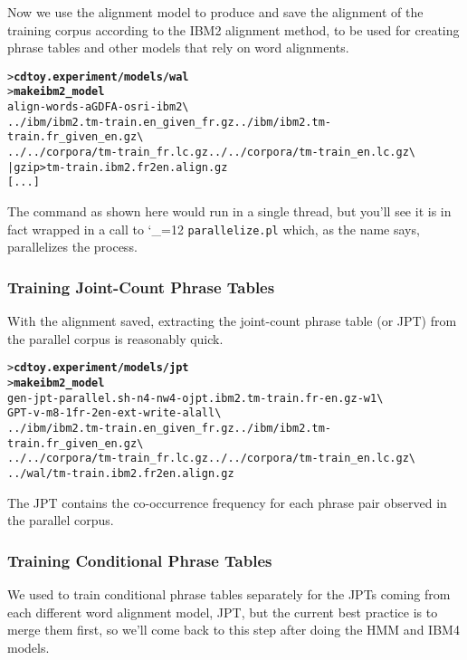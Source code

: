 \documentclass[11pt,letterpaper]{article}
\newcommand{\bs}{\textbackslash{}}
\def\code{\begingroup\catcode`\_=12 \codex}
\newcommand{\codex}[1]{\texttt{#1}\endgroup}
\begin{document}
Now we use the alignment model to produce and save the alignment of the
training corpus according to the IBM2 alignment method, to be used for creating
phrase tables and other models that rely on word alignments.

\begin{small}
\begin{alltt}
   > \textbf{cd toy.experiment/models/wal}
   > \textbf{make ibm2_model}
   align-words -a GDFA -o sri -ibm 2 \bs
      ../ibm/ibm2.tm-train.en_given_fr.gz ../ibm/ibm2.tm-train.fr_given_en.gz \bs
      ../../corpora/tm-train_fr.lc.gz ../../corpora/tm-train_en.lc.gz \bs
      | gzip > tm-train.ibm2.fr2en.align.gz
   [...]
\end{alltt}
\end{small}

The command as shown here would run in a single thread, but you'll see it is in
fact wrapped in a call to \code{parallelize.pl} which, as the name says,
parallelizes the process.

\subsubsection*{Training Joint-Count Phrase Tables}

With the alignment saved, extracting the joint-count phrase table (or JPT) from
the parallel corpus is reasonably quick.
\begin{small}
\begin{alltt}
   > \textbf{cd toy.experiment/models/jpt}
   > \textbf{make ibm2_model}
   gen-jpt-parallel.sh -n 4 -nw 4 -o jpt.ibm2.tm-train.fr-en.gz -w 1 \bs
      GPT -v -m 8 -1 fr -2 en -ext -write-al all \bs
      ../ibm/ibm2.tm-train.en_given_fr.gz ../ibm/ibm2.tm-train.fr_given_en.gz \bs
      ../../corpora/tm-train_fr.lc.gz ../../corpora/tm-train_en.lc.gz \bs
      ../wal/tm-train.ibm2.fr2en.align.gz
\end{alltt}
\end{small}
The JPT contains the co-occurrence frequency for each phrase pair observed in
the parallel corpus.

\subsubsection*{Training Conditional Phrase Tables}

We used to train conditional phrase tables separately for the JPTs coming from
each different word alignment model, JPT, but the current best practice is to
merge them first, so we'll come back to this step after doing the HMM and IBM4
models.
\end{document}
